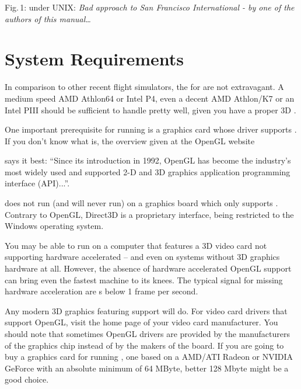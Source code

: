 \smallskip
 \noindent
Fig.\,1: \FlightGear{} under UNIX: \textit{Bad approach to San Francisco International - by one of the authors of this manual\ldots}

\section{System Requirements}
In comparison to other recent flight simulators, the  for
\FlightGear{} are not extravagant. A medium speed AMD Athlon64 or Intel
P4, even a decent AMD Athlon/K7 or an Intel PIII should be sufficient
to handle \FlightGear{} pretty well, given you have a proper 3D .

One important prerequisite for running \FlightGear{} is a graphics card whose driver supports
. If you don't know what  is, the overview given at the OpenGL website
\medskip

\medskip

\noindent
 says it best: ``Since its introduction in 1992, OpenGL has become the
industry's most widely used and supported 2-D and 3D graphics application programming
interface (API)...''.

\FlightGear{} does not run (and will never run) on a graphics board which only supports
. Contrary to OpenGL, Direct3D is a proprietary interface, being restricted to
the Windows operating system.

You may be able to run \FlightGear{} on a computer that features a 3D video card not
supporting hardware accelerated  -- and even on systems without 3D
graphics hardware at all. However, the absence of hardware accelerated OpenGL support can bring even the fastest machine to its knees. The typical signal for missing hardware acceleration
are s below 1 frame per second.

Any modern 3D graphics featuring  support will do. For
 video card drivers that support OpenGL, visit the home page of your video
card manufacturer. You should note that sometimes OpenGL drivers
are provided by the manufacturers of the graphics chip instead of by the makers of the
board. If you are going to buy a graphics card for running \FlightGear{}, one based on a
AMD/ATI Radeon or NVIDIA GeForce with an absolute minimum of 64 MByte,
better 128 Mbyte might be a good choice.

